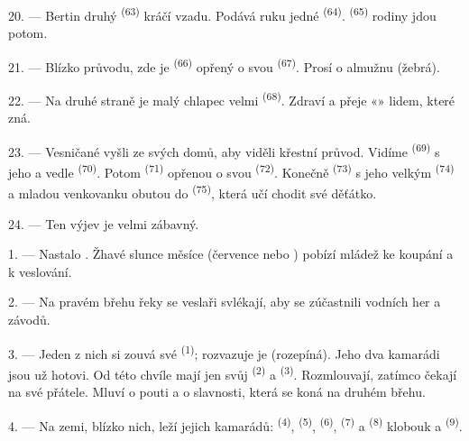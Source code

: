 20. --- Bertin druhý  \textsuperscript{(63)} kráčí vzadu. Podává ruku jedné
 \textsuperscript{(64)}.  \textsuperscript{(65)} rodiny jdou
potom.

\VUsaut{4.6mm}
\VUsaut{3.4mm}

21. --- Blízko průvodu, zde je  \textsuperscript{(66)} opřený o svou
 \textsuperscript{(67)}. Prosí o almužnu (žebrá).

22. --- Na druhé straně je malý chlapec velmi  \textsuperscript{(68)}. Zdraví
a přeje «» lidem, které zná.

23. --- Vesničané vyšli ze svých domů, aby viděli křestní průvod. Vidíme
 \textsuperscript{(69)} s jeho  a vedle
 \textsuperscript{(70)}. Potom 
\textsuperscript{(71)} opřenou o svou  \textsuperscript{(72)}. Konečně
 \textsuperscript{(73)} s jeho velkým 
\textsuperscript{(74)} a mladou venkovanku obutou do  \textsuperscript{(75)},
která učí chodit své děťátko.

24. --- Ten výjev je velmi zábavný.

\VUsaut{4.0mm}
\VUsaut{3.0mm}

\VUsaut{2.4mm}

\VUsaut{3.0mm}

1. --- Nastalo . Žhavé slunce měsíce  (července nebo
) pobízí mládež ke koupání a k veslování.

2. --- Na pravém břehu řeky se veslaři svlékají, aby se zúčastnili vodních her a závodů.

3. --- Jeden z nich si zouvá své  \textsuperscript{(1)}; rozvazuje je (rozepíná).
Jeho dva kamarádi jsou už hotovi. Od této chvíle mají jen svůj
 \textsuperscript{(2)} a  \textsuperscript{(3)}.
Rozmlouvají, zatímco čekají na své přátele. Mluví o pouti a o slavnosti, která se koná na
druhém břehu.

4. --- Na zemi, blízko nich, leží  jejich kamarádů: 
 \textsuperscript{(4)},  \textsuperscript{(5)},
 \textsuperscript{(6)},  \textsuperscript{(7)} a
 \textsuperscript{(8)} klobouk a 
\textsuperscript{(9)}.

